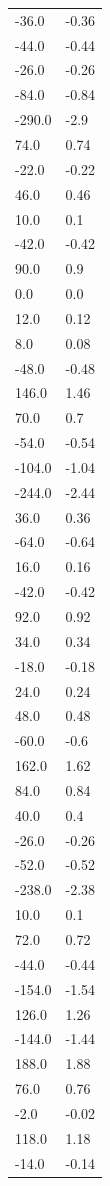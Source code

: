 \begin{longtable}{ll}
-36.0 & -0.36 \\
-44.0 & -0.44 \\
-26.0 & -0.26 \\
-84.0 & -0.84 \\
-290.0 & -2.9 \\
74.0 & 0.74 \\
-22.0 & -0.22 \\
46.0 & 0.46 \\
10.0 & 0.1 \\
-42.0 & -0.42 \\
90.0 & 0.9 \\
0.0 & 0.0 \\
12.0 & 0.12 \\
8.0 & 0.08 \\
-48.0 & -0.48 \\
146.0 & 1.46 \\
70.0 & 0.7 \\
-54.0 & -0.54 \\
-104.0 & -1.04 \\
-244.0 & -2.44 \\
36.0 & 0.36 \\
-64.0 & -0.64 \\
16.0 & 0.16 \\
-42.0 & -0.42 \\
92.0 & 0.92 \\
34.0 & 0.34 \\
-18.0 & -0.18 \\
24.0 & 0.24 \\
48.0 & 0.48 \\
-60.0 & -0.6 \\
162.0 & 1.62 \\
84.0 & 0.84 \\
40.0 & 0.4 \\
-26.0 & -0.26 \\
-52.0 & -0.52 \\
-238.0 & -2.38 \\
10.0 & 0.1 \\
72.0 & 0.72 \\
-44.0 & -0.44 \\
-154.0 & -1.54 \\
126.0 & 1.26 \\
-144.0 & -1.44 \\
188.0 & 1.88 \\
76.0 & 0.76 \\
-2.0 & -0.02 \\
118.0 & 1.18 \\
-14.0 & -0.14 \\

\end{longtable}
